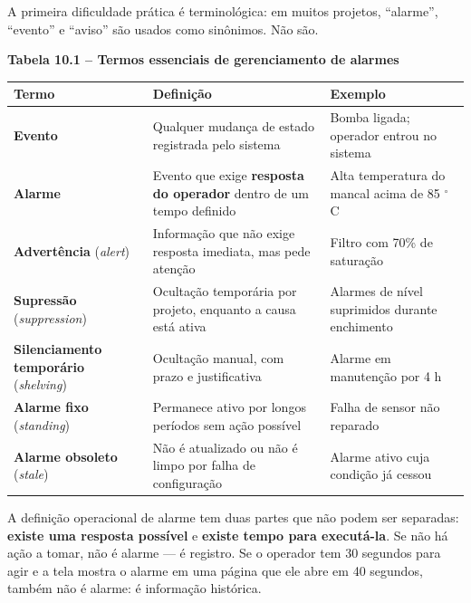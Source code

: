 A primeira dificuldade prática é terminológica: em muitos projetos, ``alarme'', ``evento'' e ``aviso'' são usados como sinônimos. Não são.

\textbf{Tabela 10.1 -- Termos essenciais de gerenciamento de alarmes}

\begin{longtable}[]{@{}
  >{\raggedright\arraybackslash}p{}
  >{\raggedright\arraybackslash}p{}
  >{\raggedright\arraybackslash}p{}@{}}
\toprule\noalign{}
\begin{minipage}[b]{\linewidth}\raggedright
Termo
\end{minipage} & \begin{minipage}[b]{\linewidth}\raggedright
Definição
\end{minipage} & \begin{minipage}[b]{\linewidth}\raggedright
Exemplo
\end{minipage} \\
\midrule\noalign{}
\endhead
\bottomrule\noalign{}
\endlastfoot
\textbf{Evento} & Qualquer mudança de estado registrada pelo sistema & Bomba ligada; operador entrou no sistema \\
\textbf{Alarme} & Evento que exige \textbf{resposta do operador} dentro de um tempo definido & Alta temperatura do mancal acima de 85 \ensuremath{^\circ}C \\
\textbf{Advertência} (\emph{alert}) & Informação que não exige resposta imediata, mas pede atenção & Filtro com 70\% de saturação \\
\textbf{Supressão} (\emph{suppression}) & Ocultação temporária por projeto, enquanto a causa está ativa & Alarmes de nível suprimidos durante enchimento \\
\textbf{Silenciamento temporário} (\emph{shelving}) & Ocultação manual, com prazo e justificativa & Alarme em manutenção por 4 h \\
\textbf{Alarme fixo} (\emph{standing}) & Permanece ativo por longos períodos sem ação possível & Falha de sensor não reparado \\
\textbf{Alarme obsoleto} (\emph{stale}) & Não é atualizado ou não é limpo por falha de configuração & Alarme ativo cuja condição já cessou \\
\end{longtable}

A definição operacional de alarme tem duas partes que não podem ser separadas: \textbf{existe uma resposta possível} e \textbf{existe tempo para executá-la}. Se não há ação a tomar, não é alarme --- é registro. Se o operador tem 30 segundos para agir e a tela mostra o alarme em uma página que ele abre em 40 segundos, também não é alarme: é informação histórica.

